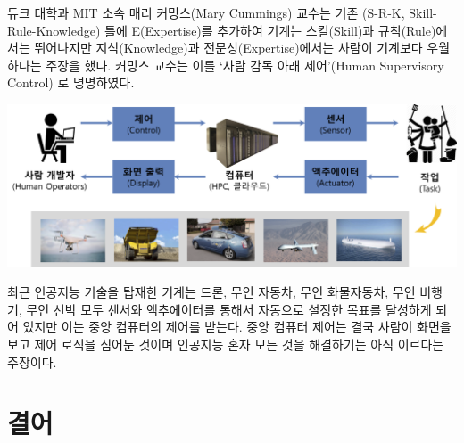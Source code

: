 \documentclass[smallextended]{svjour3}       %
\begin{document}
\begin{table}[H]
\centering
{}
\end{table}

듀크 대학과 MIT 소속 매리 커밍스(Mary Cummings) 교수는 기존 (S-R-K,
Skill- Rule-Knowledge) 틀에 E(Expertise)를 추가하여 기계는 스킬(Skill)과
규칙(Rule)에서는 뛰어나지만 지식(Knowledge)과 전문성(Expertise)에서는
사람이 기계보다 우월하다는 주장을 했다. 커밍스 교수는 이를 `사람 감독
아래 제어'(Human Supervisory Control) 로 명명하였다.

\begin{center}\includegraphics[width=1\linewidth]{fig/human-supervisory-control} \end{center}

최근 인공지능 기술을 탑재한 기계는 드론, 무인 자동차, 무인 화물자동차,
무인 비행기, 무인 선박 모두 센서와 액추에이터를 통해서 자동으로 설정한
목표를 달성하게 되어 있지만 이는 중앙 컴퓨터의 제어를 받는다. 중앙
컴퓨터 제어는 결국 사람이 화면을 보고 제어 로직을 심어둔 것이며 인공지능
혼자 모든 것을 해결하기는 아직 이르다는 주장이다.

\hypertarget{conclusion}{%
\section{결어}\label{conclusion}}
\end{document}
